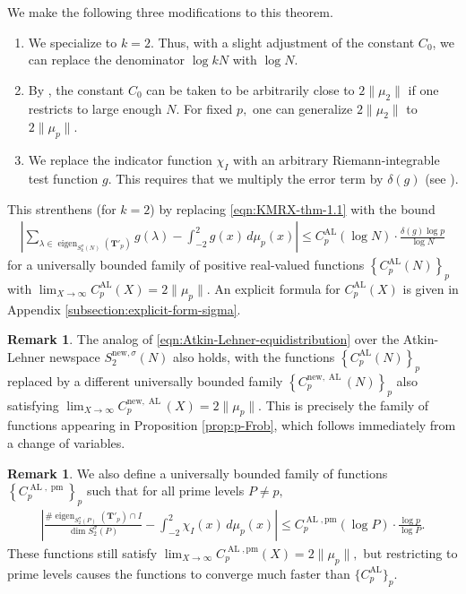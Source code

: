 \documentclass[11pt,letterpaper,reqno]{amsart}
\theoremstyle{definition}
\newtheorem{remark}[theorem]{Remark}
\numberwithin{equation}{section}
\numberwithin{figure}{section}
\numberwithin{table}{section}
\newcommand{\nw}{\mathrm{new}}
\begin{document}
We make the following three modifications to this theorem.
\begin{enumerate}
    \item We specialize to $k = 2.$ Thus, with a slight adjustment of the constant $C_0$, we can replace the denominator $\log kN$ with $\log N.$
    \item By \cite[Theorem 3.1]{KMRX}, the constant $C_0$ can be taken to be arbitrarily close to $2\| \mu_2 \|$ if one restricts to large enough $N.$ For fixed $p,$ one can generalize $2\| \mu_2 \|$ to $2\| \mu_p \|$.
    \item We replace the indicator function $\chi_I$ with an arbitrary Riemann-integrable test function $g.$ This requires that we multiply the error term by $\delta(g)$ (see \cite[Corollary 2.6]{KMRX}).
\end{enumerate}
This strenthens \cite[Theorem 1.1]{KMRX} (for $k = 2$) by replacing \eqref{eqn:KMRX-thm-1.1} with the bound
\begin{align}
    \left|
\sum_{\lambda \in \operatorname{eigen}_{S_k^{\sigma}(N)}(\mathbf{T}'_p)} g(\lambda)
-
\int_{-2}^2 g(x)\, d\mu_p(x)
\right|
\leq C_p^{\operatorname{AL}}(\log N) \cdot \frac{\delta(g)\log p}{\log N} \label{eqn:Atkin-Lehner-equidistribution}
\end{align}
for a universally bounded family of positive real-valued functions $\left\{ C_p^{\operatorname{AL}}(N) \right\}_p$ with $\lim_{X \rightarrow \infty} C_p^{\operatorname{AL}}(X) = 2 \| \mu_p \|.$ An explicit formula for $C_p^{\operatorname{AL}}(X)$ is given in Appendix \ref{subsection:explicit-form-sigma}.

\begin{remark}
    The analog of \eqref{eqn:Atkin-Lehner-equidistribution} over the Atkin-Lehner newspace $S_2^{\nw, \sigma}(N)$ also holds, with the functions $\left\{ C_p^{\operatorname{AL}}(N) \right\}_p$ replaced by a different universally bounded family $\left\{ C_p^{\nw, {\operatorname{AL}}}(N) \right\}_p$ also satisfying $\lim_{X \rightarrow \infty} C_p^{\nw, {\operatorname{AL}}}(X) = 2 \| \mu_p \|.$ This is precisely the family of functions appearing in Proposition \ref{prop:p-Frob}, which follows immediately from a change of variables.
\end{remark}

\begin{remark}
    We also define a universally bounded family of functions $\left\{C_p^{\operatorname{AL}, \operatorname{pm}}\right\}_p$ such that for all prime levels $P \neq p,$
    \begin{align}
        \left|
        \frac{\# \operatorname{eigen}_{S_2^\sigma(P)}(\mathbf{T}'_p) \cap I}
        {\dim S_2^\sigma(P)}
        -
        \int_{-2}^2 \chi_I(x)\, d\mu_p(x)
        \right|
        \leq C_p^{\operatorname{AL},\text{pm}}(\log P) \cdot \frac{\log p}{\log P}. \label{eqn:Atkin-Lehner-equidistribution-prime}
    \end{align}
These functions still satisfy $\lim_{X \rightarrow \infty } C_p^{\operatorname{AL}, \text{pm}}(X) = 2 \| \mu_p \|,$ but restricting to prime levels causes the functions to converge much faster than $\{C_p^{\operatorname{AL}}\}_p.$
\end{remark}
\end{document}
